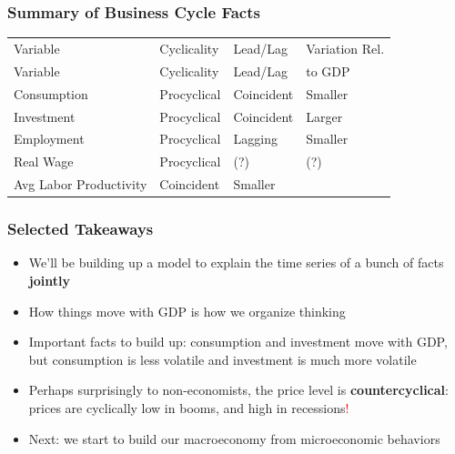 \documentclass{beamer}
\begin{document}
\begin{frame}
\frametitle[alignment=center]{Summary of Business Cycle Facts}
\begin{table}
\centering
\begin{tabular}{llll}
\hline\hline
Variable & Cyclicality & Lead/Lag & Variation Rel.  \\
Variable & Cyclicality & Lead/Lag &  to GDP \\
\hline
Consumption & Procyclical & Coincident & Smaller \\
Investment & Procyclical & Coincident & Larger \\
Employment & Procyclical & Lagging & Smaller \\
Real Wage & Procyclical & (?) & (?) \\
 Avg Labor Productivity & Coincident & Smaller \\
\hline\hline
\end{tabular}
\end{table}
\end{frame}


\begin{frame}
\frametitle[alignment=center]{Selected Takeaways}
\begin{itemize}
\item We'll be building up a model to explain the time series of a bunch of facts \textbf{jointly}
\bigskip
\item How things move with GDP is how we organize thinking
\bigskip
\item Important facts to build up:  consumption and investment move with GDP, but consumption is less volatile and investment is much more volatile
\bigskip
\item Perhaps surprisingly to non-economists, the price level is \textbf{countercyclical}: prices are cyclically low in booms, and high in recessions\textcolor{red}{!}
\item Next:  we start to build our macroeconomy from microeconomic behaviors
\end{itemize}
\end{frame}
\end{document}
